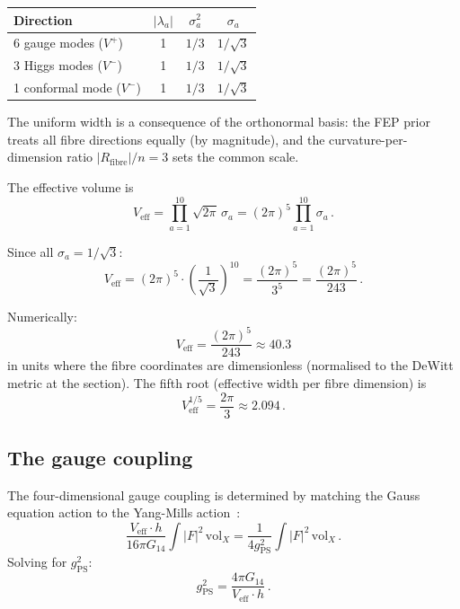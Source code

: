 \documentclass[12pt, a4paper]{article}
\theoremstyle{definition}
\theoremstyle{remark}
\newcommand{\Veff}{V_{\mathrm{eff}}}
\newcommand{\gPS}{g_{\mathrm{PS}}}
\newcommand{\Rfibre}{R_{\mathrm{fibre}}}
\begin{document}
\begin{center}
\renewcommand{\arraystretch}{1.3}
\begin{tabular}{lccc}
\toprule
\textbf{Direction} & $|\lambda_a|$ & $\sigma_a^2$ & $\sigma_a$ \\
\midrule
6 gauge modes ($V^+$) & 1 & $1/3$ & $1/\sqrt{3}$ \\
3 Higgs modes ($V^-$) & 1 & $1/3$ & $1/\sqrt{3}$ \\
1 conformal mode ($V^-$) & 1 & $1/3$ & $1/\sqrt{3}$ \\
\bottomrule
\end{tabular}
\end{center}
The uniform width is a consequence of the orthonormal basis: the FEP prior treats all fibre directions equally (by magnitude), and the curvature-per-dimension ratio $|\Rfibre|/n = 3$ sets the common scale.

The effective volume is
\begin{equation}
\label{eq:Veff}
\Veff = \prod_{a=1}^{10} \sqrt{2\pi}\, \sigma_a = (2\pi)^5 \prod_{a=1}^{10} \sigma_a\,.
\end{equation}

Since all $\sigma_a = 1/\sqrt{3}$:
\begin{equation}
\Veff = (2\pi)^5 \cdot \left(\frac{1}{\sqrt{3}}\right)^{10} = \frac{(2\pi)^5}{3^5} = \frac{(2\pi)^5}{243}\,.
\end{equation}

Numerically:
\begin{equation}
\label{eq:Veff_numerical}
\boxed{\Veff = \frac{(2\pi)^5}{243} \approx 40.3}
\end{equation}
in units where the fibre coordinates are dimensionless (normalised to the DeWitt metric at the section).
The fifth root (effective width per fibre dimension) is
\begin{equation}
\label{eq:Veff_fifth}
\Veff^{1/5} = \frac{2\pi}{3} \approx 2.094\,.
\end{equation}

\subsection{The gauge coupling}

The four-dimensional gauge coupling is determined by matching the Gauss equation action to the Yang-Mills action~\cite{Paper3,Paper7}:
\begin{equation}
\frac{\Veff \cdot h}{16\pi G_{14}} \int |F|^2\, \mathrm{vol}_X = \frac{1}{4\gPS^2} \int |F|^2\, \mathrm{vol}_X\,.
\end{equation}
Solving for $\gPS^2$:
\begin{equation}
\gPS^2 = \frac{4\pi G_{14}}{\Veff \cdot h}\,.
\end{equation}
\end{document}
